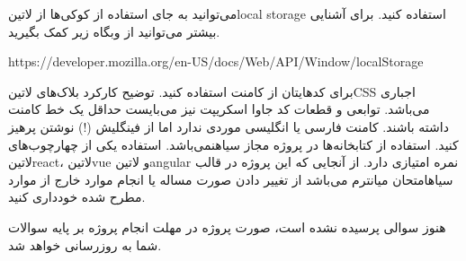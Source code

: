 \documentclass[../main.tex]{subfiles}
\begin{document}
می‌توانید به جای استفاده از کوکی‌ها از ‌لاتین{local storage} استفاده کنید. برای آشنایی بیشتر می‌توانید از وبگاه زیر کمک بگیرید.


\begin{latin}\begin{center}
https://developer.mozilla.org/en-US/docs/Web/API/Window/localStorage
\end{center}\end{latin}



     برای کدهایتان از کامنت استفاده کنید. توضیح کارکرد بلاک‌های ‌لاتین{CSS} اجباری می‌باشد. توابعی و قطعات کد جاوا اسکریپت نیز می‌بایست حداقل یک خط کامنت داشته باشند.
     کامنت فارسی یا انگلیسی موردی ندارد اما از فینگلیش (!) نوشتن پرهیز کنید.
     استفاده از کتابخانه‌ها در پروژه مجاز ‌سیاه{نمی‌باشد}.
     استفاده یکی از چهارچوب‌های ‌لاتین{react}، ‌لاتین{vue} و ‌لاتین{angular} نمره امتیازی دارد.
     از آنجایی که این پروژه در قالب ‌سیاه{امتحان میانترم} می‌باشد از تغییر دادن صورت مساله یا انجام موارد خارج از موارد مطرح شده خودداری کنید.


هنوز سوالی پرسیده نشده است، صورت پروژه در مهلت انجام پروژه بر پایه سوالات شما به روزرسانی خواهد شد.
\end{document}
